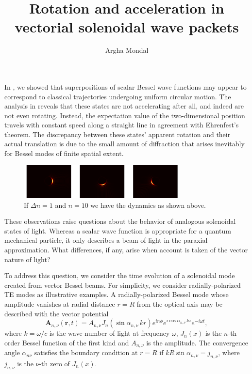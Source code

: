 \documentclass[aps,prl,preprint,notitlepage]{revtex4-1}
\renewcommand{\vec}[1]{\boldsymbol{#1}}
\begin{document}
\title{Rotation and acceleration in vectorial solenoidal wave packets}

\author{Argha Mondal}

\maketitle

In \cite{mondal18a}, we showed that
superpositions of scalar Bessel wave functions
may appear to correspond to classical trajectories
undergoing uniform circular motion.
The analysis in \cite{mondal18a} reveals that these
states are not accelerating after all, and indeed are not
even rotating.
Instead, the expectation value of the two-dimensional
position travels with constant speed along a straight line
in agreement with Ehrenfest's theorem.
The discrepancy between these states' apparent rotation
and their actual translation is due to the small amount
of diffraction that arises inevitably for Bessel modes
of finite spatial extent.

\begin{figure}
\centering
\includegraphics[width=0.75\textwidth]{pic2}
\caption{If $\Delta n = 1$ and $n = 10$ we have the dynamics as shown above.}
\end{figure}

These observations raise questions about the behavior of
analogous solenoidal states of light.
Whereas a scalar wave function is appropriate for
a quantum mechanical particle, it only describes a
beam of light in the paraxial approximation.
What differences, if any, arise when account is taken
of the vector nature of light?

To address this question, we consider the time evolution of
a solenoidal mode created from vector Bessel beams.
For simplicity, we consider radially-polarized TE
modes as illustrative examples.
A radially-polarized Bessel mode whose amplitude
vanishes at radial distance $r = R$ from the optical
axis may be described
with the vector potential
\begin{equation}
  \vec{A}_{n,\nu}(\vec{r},t) 
  = 
  A_{n,\nu} J_{n}\!\left( \sin \alpha_{n,\nu} \, k r \right)
  e^{in\phi} e^{i\cos\alpha_{n,\nu} \, kz} e^{- i \omega t},
\end{equation}
where $k = \omega/c$ is the wave number of light at
frequency $\omega$, $J_n(x)$ is the $n$-th order
Bessel function of the first kind and $A_{n,\nu}$ is
the amplitude.
The convergence angle $\alpha_{n\nu}$ satisfies
the boundary condition at $r = R$
if $kR \sin\alpha_{n,\nu} = j_{n,\nu}$,
where $j_{n,\nu}$ is the $\nu$-th zero of $J_n(x)$.
\end{document}
